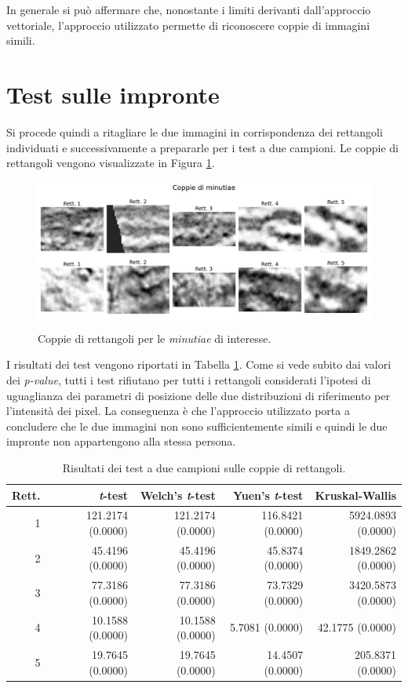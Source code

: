 \documentclass[12pt]{article}
\begin{document}
In generale si può affermare che, nonostante i limiti derivanti dall'approccio vettoriale, l'approccio utilizzato permette di riconoscere coppie di immagini simili.

\section*{Test sulle impronte}
\noindent
Si procede quindi a ritagliare le due immagini in corrispondenza dei rettangoli individuati e successivamente a prepararle per i test a due campioni. Le coppie di rettangoli vengono visualizzate in Figura \ref{fig:paired_fp}.

\begin{figure}[!htb]
    \centering
    \includegraphics[width=1.0\textwidth]{figures/paired_boxes.jpg}
    \caption{Coppie di rettangoli per le \emph{minutiae} di interesse.}
    \label{fig:paired_fp}
\end{figure}

I risultati dei test vengono riportati in Tabella \ref{tab:two_samples_tests}. Come si vede subito dai valori dei \emph{p-value}, tutti i test rifiutano per tutti i rettangoli considerati l'ipotesi di uguaglianza dei parametri di posizione delle due distribuzioni di riferimento per l'intensità dei pixel. La conseguenza è che l'approccio utilizzato porta a concludere che le due immagini non sono sufficientemente simili e quindi le due impronte non appartengono alla stessa persona.

\setlength{\tabcolsep}{8pt}
\begin{table}[!htb]
    \centering
    \begin{tabular}{rrrrr}
        \toprule
        Rett. & \emph{t}-test & Welch's \emph{t}-test & Yuen's \emph{t}-test &  Kruskal-Wallis \\
        \midrule
        1 & 121.2174 (0.0000) & 121.2174 (0.0000) & 116.8421 (0.0000) & 5924.0893 (0.0000)\\
        2 & 45.4196 (0.0000) & 45.4196 (0.0000) & 45.8374 (0.0000) & 1849.2862 (0.0000)\\
        3 & 77.3186 (0.0000) & 77.3186 (0.0000) & 73.7329 (0.0000) & 3420.5873 (0.0000)\\
        4 & 10.1588 (0.0000) & 10.1588 (0.0000) & 5.7081 (0.0000) & 42.1775 (0.0000)\\
        5 & 19.7645 (0.0000) & 19.7645 (0.0000) & 14.4507 (0.0000) & 205.8371 (0.0000)\\
        \bottomrule
        \end{tabular}
    \caption{Risultati dei test a due campioni sulle coppie di rettangoli.}
    \label{tab:two_samples_tests}
\end{table}
\end{document}
